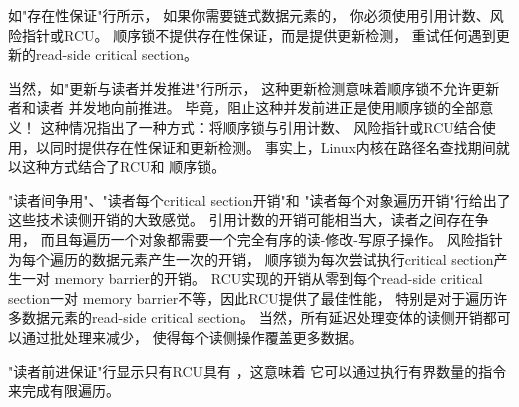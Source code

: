 如"存在性保证"行所示，
如果你需要链式数据元素的，
你必须使用引用计数、风险指针或RCU\@。
顺序锁不提供存在性保证，而是提供更新检测，
重试任何遇到更新的read-side critical section。

当然，如"更新与读者并发推进"行所示，
这种更新检测意味着顺序锁不允许更新者和读者
并发地向前推进。
毕竟，阻止这种并发前进正是使用顺序锁的全部意义！
这种情况指出了一种方式：将顺序锁与引用计数、
风险指针或RCU结合使用，以同时提供存在性保证和更新检测。
事实上，Linux内核在路径名查找期间就以这种方式结合了RCU和
顺序锁。

"读者间争用"、"读者每个critical section开销"和
"读者每个对象遍历开销"行给出了这些技术读侧开销的大致感觉。
引用计数的开销可能相当大，读者之间存在争用，
而且每遍历一个对象都需要一个完全有序的读-修改-写原子操作。
风险指针为每个遍历的数据元素产生一次的开销，
顺序锁为每次尝试执行critical section产生一对
memory barrier的开销。
RCU实现的开销从零到每个read-side critical section一对
memory barrier不等，因此RCU提供了最佳性能，
特别是对于遍历许多数据元素的read-side critical section。
当然，所有延迟处理变体的读侧开销都可以通过批处理来减少，
使得每个读侧操作覆盖更多数据。

\QuickQuizEnd

"读者前进保证"行显示只有RCU具有
，这意味着
它可以通过执行有界数量的指令来完成有限遍历。

